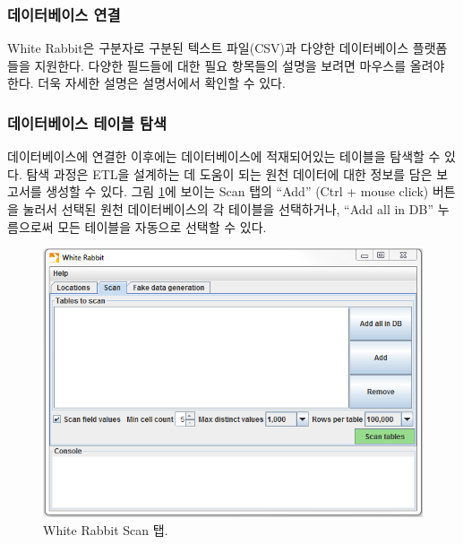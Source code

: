 \documentclass[11pt]{book}
\theoremstyle{definition}
\theoremstyle{definition}
\theoremstyle{definition}
\theoremstyle{remark}
\begin{document}
\subsubsection*{데이터베이스 연결}\label{-}

White Rabbit은 구분자로 구분된 텍스트 파일(CSV)과 다양한 데이터베이스
플랫폼들을 지원한다. 다양한 필드들에 대한 필요 항목들의 설명을 보려면
마우스를 올려야 한다. 더욱 자세한 설명은 설명서에서 확인할 수 있다.

\subsubsection*{데이터베이스 테이블 탐색}\label{--}

데이터베이스에 연결한 이후에는 데이터베이스에 적재되어있는 테이블을
탐색할 수 있다. 탐색 과정은 ETL을 설계하는 데 도움이 되는 원천 데이터에
대한 정보를 담은 보고서를 생성할 수 있다. 그림
\ref{fig:WhiteRabbitAddTables}에 보이는 Scan 탭의 ``Add'' (Ctrl + mouse
click) 버튼을 눌러서 선택된 원천 데이터베이스의 각 테이블을 선택하거나,
``Add all in DB'' 누름으로써 모든 테이블을 자동으로 선택할 수 있다.

\begin{figure}

{\centering \includegraphics[width=1\linewidth]{images/ExtractTransformLoad/WhiteRabbitAddTables} 

}

\caption{White Rabbit Scan 탭.}\label{fig:WhiteRabbitAddTables}
\end{figure}
\end{document}
